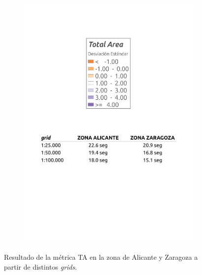 \begin{figure}
\begin{subfigure}[b]{0.4\textwidth}
    \includegraphics[width=\textwidth]{ResultadosyDiscusion/Figs/Results/leyenda3.pdf}
    \label{fig:leyenda3}
  \end{subfigure}
  
  \caption{Resultado de la métrica TA en la zona de Alicante y Zaragoza a partir de distintos \textit{grids}.}
  \label{fig:l_area}
\end{figure}